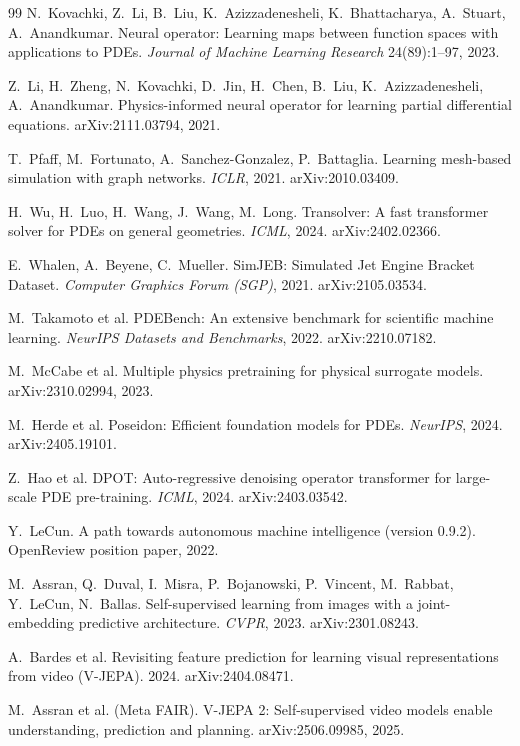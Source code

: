 \documentclass[11pt]{article}
\begin{document}
\begin{thebibliography}{99}
N.~Kovachki, Z.~Li, B.~Liu, K.~Azizzadenesheli, K.~Bhattacharya, A.~Stuart,
A.~Anandkumar.
Neural operator: Learning maps between function spaces with applications to
PDEs. \emph{Journal of Machine Learning Research} 24(89):1--97, 2023.

Z.~Li, H.~Zheng, N.~Kovachki, D.~Jin, H.~Chen, B.~Liu, K.~Azizzadenesheli,
A.~Anandkumar.
Physics-informed neural operator for learning partial differential
equations. arXiv:2111.03794, 2021.

T.~Pfaff, M.~Fortunato, A.~Sanchez-Gonzalez, P.~Battaglia.
Learning mesh-based simulation with graph networks. \emph{ICLR}, 2021.
arXiv:2010.03409.

H.~Wu, H.~Luo, H.~Wang, J.~Wang, M.~Long.
Transolver: A fast transformer solver for PDEs on general geometries.
\emph{ICML}, 2024. arXiv:2402.02366.

E.~Whalen, A.~Beyene, C.~Mueller.
SimJEB: Simulated Jet Engine Bracket Dataset.
\emph{Computer Graphics Forum (SGP)}, 2021. arXiv:2105.03534.

M.~Takamoto et al.
PDEBench: An extensive benchmark for scientific machine learning.
\emph{NeurIPS Datasets and Benchmarks}, 2022. arXiv:2210.07182.

M.~McCabe et al.
Multiple physics pretraining for physical surrogate models.
arXiv:2310.02994, 2023.

M.~Herde et al.
Poseidon: Efficient foundation models for PDEs. \emph{NeurIPS}, 2024.
arXiv:2405.19101.

Z.~Hao et al.
DPOT: Auto-regressive denoising operator transformer for large-scale PDE
pre-training. \emph{ICML}, 2024. arXiv:2403.03542.

Y.~LeCun.
A path towards autonomous machine intelligence (version 0.9.2).
OpenReview position paper, 2022.

M.~Assran, Q.~Duval, I.~Misra, P.~Bojanowski, P.~Vincent, M.~Rabbat,
Y.~LeCun, N.~Ballas.
Self-supervised learning from images with a joint-embedding predictive
architecture. \emph{CVPR}, 2023. arXiv:2301.08243.

A.~Bardes et al.
Revisiting feature prediction for learning visual representations from
video (V-JEPA). 2024. arXiv:2404.08471.

M.~Assran et al. (Meta FAIR).
V-JEPA 2: Self-supervised video models enable understanding, prediction and
planning. arXiv:2506.09985, 2025.


\end{thebibliography}
\end{document}
